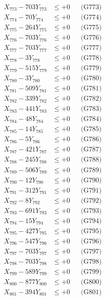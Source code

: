 \documentclass[a4paper,10pt]{article}
\begin{document}
{\begin{align}
X_{773} - 703Y_{773} &\leq +0 && \text{(G773)} \\
X_{774} - 70Y_{774} &\leq +0 && \text{(G774)} \\
X_{775} - 264Y_{775} &\leq +0 && \text{(G775)} \\
X_{776} - 703Y_{776} &\leq +0 && \text{(G776)} \\
X_{777} - 703Y_{777} &\leq +0 && \text{(G777)} \\
X_{778} - 3Y_{778} &\leq +0 && \text{(G778)} \\
X_{779} - 515Y_{779} &\leq +0 && \text{(G779)} \\
X_{780} - 3Y_{780} &\leq +0 && \text{(G780)} \\
\allowbreak
X_{781} - 509Y_{781} &\leq +0 && \text{(G781)} \\
X_{782} - 339Y_{782} &\leq +0 && \text{(G782)} \\
X_{783} - 441Y_{783} &\leq +0 && \text{(G783)} \\
X_{784} - 48Y_{784} &\leq +0 && \text{(G784)} \\
X_{785} - 14Y_{785} &\leq +0 && \text{(G785)} \\
X_{786} - 5Y_{786} &\leq +0 && \text{(G786)} \\
X_{787} - 421Y_{787} &\leq +0 && \text{(G787)} \\
X_{788} - 245Y_{788} &\leq +0 && \text{(G788)} \\
X_{789} - 506Y_{789} &\leq +0 && \text{(G789)} \\
X_{790} - 12Y_{790} &\leq +0 && \text{(G790)} \\
\allowbreak
X_{791} - 312Y_{791} &\leq +0 && \text{(G791)} \\
X_{792} - 8Y_{792} &\leq +0 && \text{(G792)} \\
X_{793} - 691Y_{793} &\leq +0 && \text{(G793)} \\
X_{794} - 15Y_{794} &\leq +0 && \text{(G794)} \\
X_{795} - 427Y_{795} &\leq +0 && \text{(G795)} \\
X_{796} - 547Y_{796} &\leq +0 && \text{(G796)} \\
X_{797} - 703Y_{797} &\leq +0 && \text{(G797)} \\
X_{798} - 703Y_{798} &\leq +0 && \text{(G798)} \\
X_{799} - 589Y_{799} &\leq +0 && \text{(G799)} \\
X_{800} - 877Y_{800} &\leq +0 && \text{(G800)} \\
\allowbreak
X_{801} - 394Y_{801} &\leq +0 && \text{(G801)} \\

\end{align}}
\end{document}
